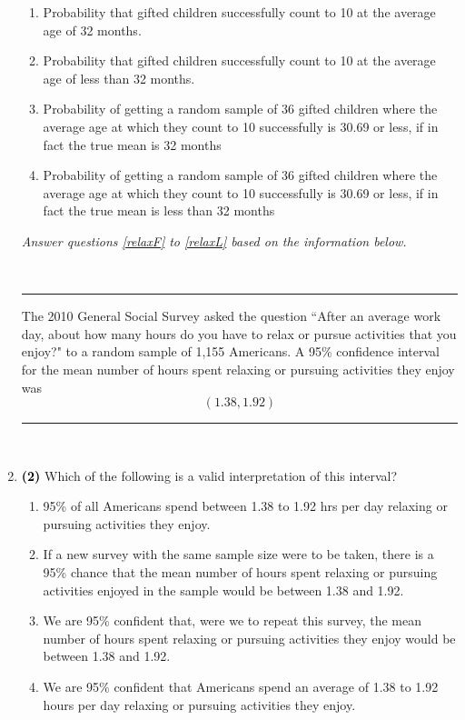 \documentclass[11pt]{article}
\newcommand{\solnMult}[1]{ #1 }	%
\newcommand{\pts}[1]{ \textbf{{\footnotesize \textcolor{black}{(#1)}}} }	%
\begin{document}
\begin{enumerate}
\begin{enumerate}
\item Probability that gifted children successfully count to 10 at the average age of 32 months.
\item Probability that gifted children successfully count to 10 at the average age of less than 32 months.
\item \solnMult{Probability of getting a random sample of 36 gifted children where the average age at which they count to 10 successfully is 30.69 or less, if in fact the true mean is 32 months}
\item Probability of getting a random sample of 36 gifted children where the average age at which they count to 10 successfully is 30.69 or less, if in fact the true mean is less than 32 months
\end{enumerate}

\vfill

\pagebreak

%



%

\pagebreak

\begin{center}
\textit{Answer questions \ref{relaxF} to \ref{relaxL} based on the information below.}
\end{center}
$\:$
\hrule
The 2010 General Social Survey asked the question ``After an average work day, about how many hours do you have to relax or pursue activities that you enjoy?" to a random sample of 1,155 Americans. A 95\% confidence interval for the mean number of hours spent relaxing or pursuing activities they enjoy was	
\[ (1.38, 1.92) \]
\hrule
$\:$


\item \pts{2} \label{relaxF} Which of the following is a valid interpretation of this interval?
\begin{enumerate}
\item 95\% of all Americans spend between 1.38 to 1.92 hrs per day relaxing or pursuing activities they enjoy.
\item If a new survey with the same sample size were to be taken, there is a 95\% chance that the mean number of hours spent relaxing or pursuing activities enjoyed in the sample would be between 1.38 and 1.92.
\item We are 95\% confident that, were we to repeat this survey, the mean number of hours spent relaxing or pursuing activities they enjoy would be between 1.38 and 1.92.
\item \solnMult{We are 95\% confident that Americans spend an average of 1.38 to 1.92 hours per day  relaxing or pursuing activities they enjoy.} \\
\end{enumerate}


\end{enumerate}
\end{document}
